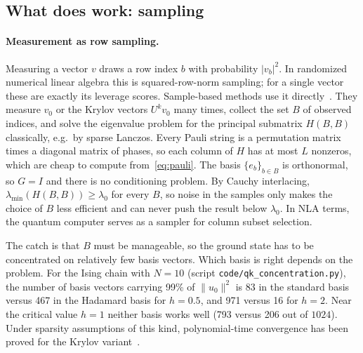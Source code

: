\documentclass[11pt,a4paper]{article}
\begin{document}
\subsection{What does work: sampling}\label{sec:sampling}

\paragraph{Measurement as row sampling.} Measuring a vector $v$ draws a
row index $b$ with probability $|v_b|^2$. In randomized numerical linear
algebra this is squared-row-norm sampling; for a single vector these
are exactly its leverage scores. Sample-based methods use it
directly~\cite{RM25,SKQD}. They measure $v_0$ or the Krylov vectors
$U^kv_0$ many times, collect the set $B$ of observed indices, and solve
the eigenvalue problem for the principal submatrix $H(B,B)$ classically,
e.g.\ by sparse Lanczos. Every Pauli string is a permutation matrix times
a diagonal matrix of phases, so each column of $H$ has at most $L$
nonzeros, which are cheap to compute from~\eqref{eq:pauli}. The basis
$\{e_b\}_{b\in B}$ is orthonormal, so $G=I$ and there is no conditioning
problem. By Cauchy interlacing, $\lambda_{\min}(H(B,B))\ge\lambda_0$ for
every $B$, so noise in the samples only makes the choice of $B$ less
efficient and can never push the result below $\lambda_0$. In NLA terms,
the quantum computer serves as a sampler for column subset selection.

The catch is that $B$ must be manageable, so the ground state has to be
concentrated on relatively few basis vectors. Which basis is right
depends on the problem. For the Ising chain with $N=10$ (script
\texttt{code/qk\_concentration.py}), the number of basis vectors carrying 99\%
of $\|u_0\|^2$ is 83 in the standard basis versus 467 in the Hadamard
basis for $h=0.5$, and 971 versus 16 for $h=2$. Near the critical value
$h=1$ neither basis works well (793 versus 206 out of $1024$). Under
sparsity assumptions of this kind, polynomial-time convergence has been
proved for the Krylov variant~\cite{SKQD}.
\end{document}
